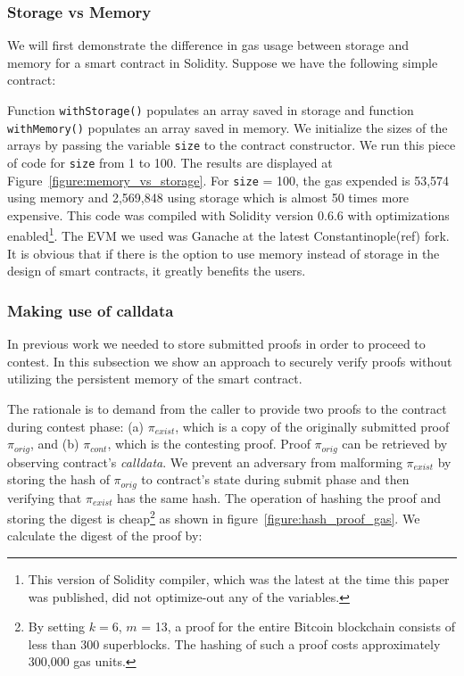 \subsubsection{Storage vs Memory}

We will first demonstrate the difference in gas usage between storage and
memory for a smart contract in Solidity. Suppose we have the following simple
contract:



Function \texttt{withStorage()} populates an array saved in storage and
function \texttt{withMemory()} populates an array saved in memory. We
initialize the sizes of the arrays by passing the variable \texttt{size} to the
contract constructor. We run this piece of code for \texttt{size} from 1 to
100. The results are displayed at Figure~\ref{figure:memory_vs_storage}. For
\texttt{size} = 100, the gas expended is 53,574 using memory and 2,569,848
using storage which is almost 50 times more expensive. This code was compiled
with Solidity version 0.6.6 with optimizations enabled\footnote{This version of
Solidity compiler, which was the latest at the time this paper was published,
did not optimize-out any of the variables.}. The EVM we used  was Ganache at
the latest Constantinople(ref) fork. It is obvious that if there is the option
to use memory instead of storage in the design of smart contracts, it greatly
benefits the users.



\subsubsection{Making use of calldata}

In previous work we needed to store submitted proofs in order to proceed to
contest. In this subsection we show an approach to securely verify proofs
without utilizing the persistent memory of the smart contract.

The rationale is to demand from the caller to provide two proofs to the
contract during contest phase: (a) $\pi_{exist}$, which is a copy of the
originally submitted proof $\pi_{orig}$, and (b) $\pi_{cont}$, which is the
contesting proof. Proof $\pi_{orig}$ can be retrieved by observing contract's
\textit{calldata}. We prevent an adversary from malforming $\pi_{exist}$ by
storing the hash of $\pi_{orig}$ to contract's state during submit phase and
then verifying that $\pi_{exist}$ has the same hash. The operation of hashing
the proof and storing the digest is cheap\footnote{By setting $k=6$, $m$ = 13,
a proof for the entire Bitcoin blockchain consists of less than 300
superblocks. The hashing of such a proof costs approximately 300,000 gas
units.} as shown in figure~\ref{figure:hash_proof_gas}. We calculate the digest
of the proof by:

